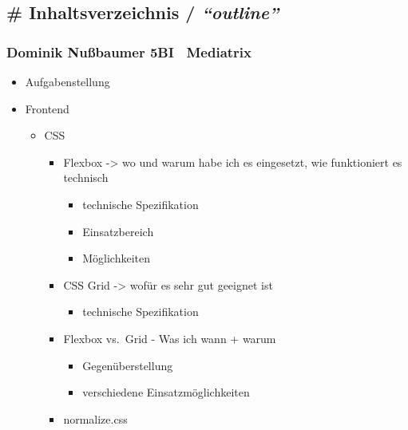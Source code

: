 \hypertarget{inhaltsverzeichnis-outline}{%
\subsection{\texorpdfstring{\# Inhaltsverzeichnis /
\emph{``outline''}}{\# Inhaltsverzeichnis / ``outline''}}\label{inhaltsverzeichnis-outline}}

\hypertarget{dominik-nuuxdfbaumer-5bi-mediatrix}{%
\subsubsection{Dominik Nußbaumer \textbar{} 5BI
\textbar{}~Mediatrix}\label{dominik-nuuxdfbaumer-5bi-mediatrix}}

\begin{itemize}
\tightlist
\item
  Aufgabenstellung
\item
  Frontend

  \begin{itemize}
  \tightlist
  \item
    CSS

    \begin{itemize}
    \tightlist
    \item
      Flexbox -\textgreater{} wo und warum habe ich es eingesetzt, wie
      funktioniert es technisch

      \begin{itemize}
      \tightlist
      \item
        technische Spezifikation
      \item
        Einsatzbereich
      \item
        Möglichkeiten
      \end{itemize}
    \item
      CSS Grid -\textgreater{} wofür es sehr gut geeignet ist

      \begin{itemize}
      \tightlist
      \item
        technische Spezifikation
      \end{itemize}
    \item
      Flexbox vs.~Grid - Was ich wann + warum

      \begin{itemize}
      \tightlist
      \item
        Gegenüberstellung
      \item
        verschiedene Einsatzmöglichkeiten
      \end{itemize}
    \item
      normalize.css


\end{itemize}
\end{itemize}
\end{itemize}
